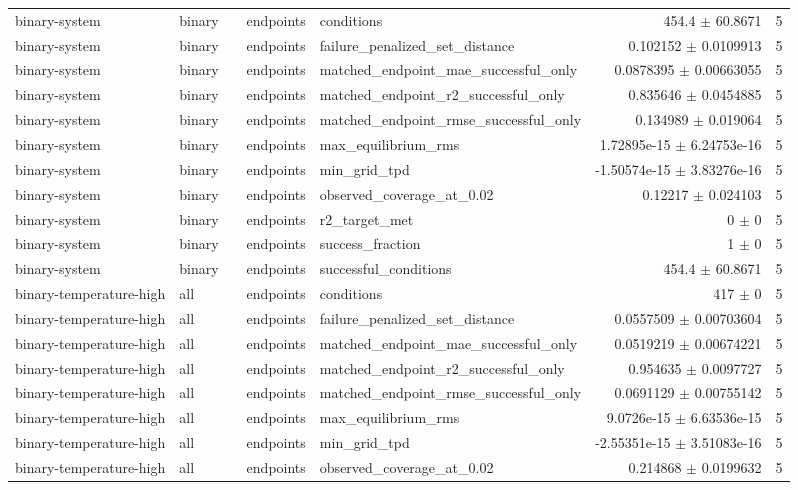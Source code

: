 \begin{tabular}{lllllrr}
binary-system & binary &  & endpoints & conditions & 454.4 $\pm$ 60.8671 & 5 \\
binary-system & binary &  & endpoints & failure_penalized_set_distance & 0.102152 $\pm$ 0.0109913 & 5 \\
binary-system & binary &  & endpoints & matched_endpoint_mae_successful_only & 0.0878395 $\pm$ 0.00663055 & 5 \\
binary-system & binary &  & endpoints & matched_endpoint_r2_successful_only & 0.835646 $\pm$ 0.0454885 & 5 \\
binary-system & binary &  & endpoints & matched_endpoint_rmse_successful_only & 0.134989 $\pm$ 0.019064 & 5 \\
binary-system & binary &  & endpoints & max_equilibrium_rms & 1.72895e-15 $\pm$ 6.24753e-16 & 5 \\
binary-system & binary &  & endpoints & min_grid_tpd & -1.50574e-15 $\pm$ 3.83276e-16 & 5 \\
binary-system & binary &  & endpoints & observed_coverage_at_0.02 & 0.12217 $\pm$ 0.024103 & 5 \\
binary-system & binary &  & endpoints & r2_target_met & 0 $\pm$ 0 & 5 \\
binary-system & binary &  & endpoints & success_fraction & 1 $\pm$ 0 & 5 \\
binary-system & binary &  & endpoints & successful_conditions & 454.4 $\pm$ 60.8671 & 5 \\
binary-temperature-high & all &  & endpoints & conditions & 417 $\pm$ 0 & 5 \\
binary-temperature-high & all &  & endpoints & failure_penalized_set_distance & 0.0557509 $\pm$ 0.00703604 & 5 \\
binary-temperature-high & all &  & endpoints & matched_endpoint_mae_successful_only & 0.0519219 $\pm$ 0.00674221 & 5 \\
binary-temperature-high & all &  & endpoints & matched_endpoint_r2_successful_only & 0.954635 $\pm$ 0.0097727 & 5 \\
binary-temperature-high & all &  & endpoints & matched_endpoint_rmse_successful_only & 0.0691129 $\pm$ 0.00755142 & 5 \\
binary-temperature-high & all &  & endpoints & max_equilibrium_rms & 9.0726e-15 $\pm$ 6.63536e-15 & 5 \\
binary-temperature-high & all &  & endpoints & min_grid_tpd & -2.55351e-15 $\pm$ 3.51083e-16 & 5 \\
binary-temperature-high & all &  & endpoints & observed_coverage_at_0.02 & 0.214868 $\pm$ 0.0199632 & 5 \\

\end{tabular}
